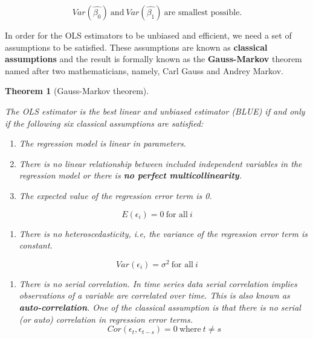 \documentclass[
]{book}
\providecommand{\tightlist}{%
  \setlength{\itemsep}{0pt}\setlength{\parskip}{0pt}}
\newtheorem{theorem}{Theorem}[chapter]
\theoremstyle{definition}
\theoremstyle{definition}
\theoremstyle{definition}
\theoremstyle{definition}
\theoremstyle{remark}
\begin{document}
\[Var(\hat{\beta_0}) \ \text{and} \ Var(\hat{\beta_1}) \ \text{are smallest possible.} \]

In order for the OLS estimators to be unbiased and efficient, we need a set of assumptions to be satisfied. These assumptions are known as \textbf{classical assumptions} and the result is formally known as the \textbf{Gauss-Markov} theorem named after two mathematicians, namely, Carl Gauss and Andrey Markov.

\begin{theorem}[Gauss-Markov theorem]
\protect\hypertarget{thm:unnamed-chunk-90}{}\label{thm:unnamed-chunk-90}

The OLS estimator is the best linear and unbiased estimator (BLUE) if and only if the following six classical assumptions are satisfied:

\begin{enumerate}
\def\labelenumi{\arabic{enumi}.}
\item
  The regression model is linear in parameters.
\item
  There is no linear relationship between included independent variables in the regression model or there is \textbf{no perfect multicollinearity}.
\item
  The expected value of the regression error term is 0.
\end{enumerate}

\[E(\epsilon_i)=0 \ \text{for all} \ i\]

\begin{enumerate}
\def\labelenumi{\arabic{enumi}.}
\setcounter{enumi}{3}
\tightlist
\item
  There is no heteroscedasticity, i.e, the variance of the regression error term is constant.
\end{enumerate}

\[Var(\epsilon_i)=\sigma^2 \ \text{for all} \ i\]

\begin{enumerate}
\def\labelenumi{\arabic{enumi}.}
\setcounter{enumi}{4}
\tightlist
\item
  There is no serial correlation. In time series data serial correlation implies observations of a variable are correlated over time. This is also known as \textbf{auto-correlation}. One of the classical assumption is that there is no serial (or auto) correlation in regression error terms.\[Cor(\epsilon_t, \epsilon_{t-s})=0 \ \text{where} \ t\neq s\]
\end{enumerate}

\end{theorem}
\end{document}
